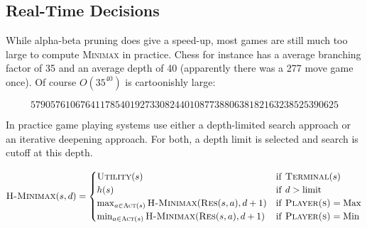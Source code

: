 \documentclass[11pt]{article}
\begin{document}
\begin{algorithm}
\begin{algorithmic}[1]

  \EndIf{}
  \EndFor{}
  
  \EndIf{}
  \EndFor{}
  \EndIf{}
  \EndProcedure{}
\end{algorithmic}
\end{algorithm}



\subsection{Real-Time Decisions}

While alpha-beta pruning does give a speed-up, most games are still much too large to compute \textsc{Minimax} in practice. Chess for instance has a average branching factor of 35 and an average depth of 40 (apparently there was a 277 move game once). Of course $O(35^{40})$ is cartoonishly large:

\[ 57905761067641178540192733082440108773880638182163238525390625\] 

In practice game playing systems use either a depth-limited search approach or an iterative deepening approach. For both, a depth limit is selected and search is cutoff at this depth. 

\[ \mathrm{\textsc{H-Minimax}}(s, d) = \begin{cases} 
  \mathrm{\textsc{Utility}}(s) & \mathrm{if\ } \mathrm{\textsc{Terminal}}(s)  \\
  h(s) & \mathrm{if\ } d > \mathrm{limit}   \\
  \max_{a \in \mathrm{\textsc{Act}}(s) } \mathrm{\textsc{H-Minimax}}(\mathrm{\textsc{Res}}(s, a), d+1) & \mathrm{if\ } \mathrm{\textsc{Player(s)}} = \mathrm{Max}  \\
  \min_{a \in \mathrm{\textsc{Act}}(s) } \mathrm{\textsc{H-Minimax}}(\mathrm{\textsc{Res}}(s, a), d+1) & \mathrm{if\ } \mathrm{\textsc{Player(s)}} = \mathrm{Min} \end{cases}\] 
\end{document}
